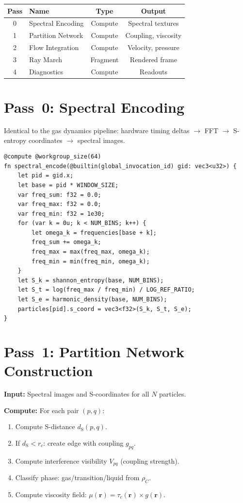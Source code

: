 \documentclass[twocolumn,10pt,a4paper]{article}
\theoremstyle{plain}
\theoremstyle{definition}
\theoremstyle{remark}
\newcommand{\tauc}{\tau_c}
\newcommand{\dS}{d_{\mathrm{S}}}
\begin{document}
\begin{center}
\begin{tabular}{clcc}
\toprule
\textbf{Pass} & \textbf{Name} & \textbf{Type} & \textbf{Output} \\
\midrule
0 & Spectral Encoding           & Compute  & Spectral textures \\
1 & Partition Network            & Compute  & Coupling, viscosity \\
2 & Flow Integration             & Compute  & Velocity, pressure \\
3 & Ray March                    & Fragment & Rendered frame \\
4 & Diagnostics                  & Compute  & Readouts \\
\bottomrule
\end{tabular}
\end{center}

\section{Pass~0: Spectral Encoding}
\label{sec:pass0}

Identical to the gas dynamics pipeline: hardware timing deltas $\to$ FFT $\to$ S-entropy coordinates $\to$ spectral images.

\begin{lstlisting}[style=wgsl,caption={Pass 0: Spectral Encoding (WGSL)}]
@compute @workgroup_size(64)
fn spectral_encode(@builtin(global_invocation_id) gid: vec3<u32>) {
    let pid = gid.x;
    let base = pid * WINDOW_SIZE;
    var freq_sum: f32 = 0.0;
    var freq_max: f32 = 0.0;
    var freq_min: f32 = 1e30;
    for (var k = 0u; k < NUM_BINS; k++) {
        let omega_k = frequencies[base + k];
        freq_sum += omega_k;
        freq_max = max(freq_max, omega_k);
        freq_min = min(freq_min, omega_k);
    }
    let S_k = shannon_entropy(base, NUM_BINS);
    let S_t = log(freq_max / freq_min) / LOG_REF_RATIO;
    let S_e = harmonic_density(base, NUM_BINS);
    particles[pid].s_coord = vec3<f32>(S_k, S_t, S_e);
}
\end{lstlisting}

\section{Pass~1: Partition Network Construction}
\label{sec:pass1}

\textbf{Input:} Spectral images and S-coordinates for all $N$ particles.

\textbf{Compute:} For each pair $(p, q)$:
\begin{enumerate}
    \item Compute S-distance $\dS(p,q)$.
    \item If $\dS < r_c$: create edge with coupling $g_{pq}$.
    \item Compute interference visibility $V_{pq}$ (coupling strength).
    \item Classify phase: gas/transition/liquid from $\rho_C$.
    \item Compute viscosity field: $\mu(\mathbf{r}) = \tauc(\mathbf{r}) \times g(\mathbf{r})$.
\end{enumerate}
\end{document}
